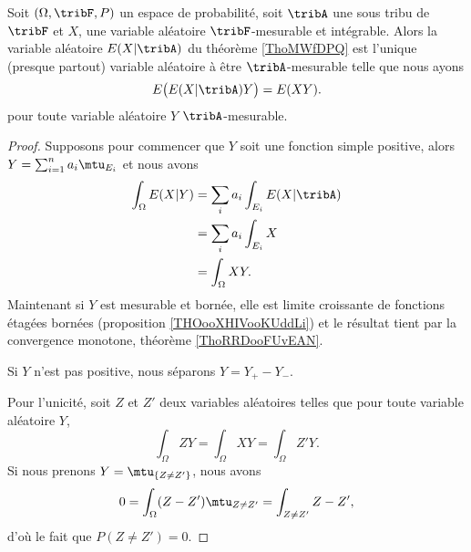 \begin{proposition}
    Soit \( (\Omega,\tribF,P)\) un espace de probabilité, soit \( \tribA\) une sous tribu de \( \tribF\) et \( X\), une variable aléatoire \( \tribF\)-mesurable et intégrable. Alors la variable aléatoire \( E(X|\tribA)\) du théorème \ref{ThoMWfDPQ} est l'unique (presque partout) variable aléatoire à être \( \tribA\)-mesurable telle que nous ayons
    \begin{equation}
        E\big( E(X|\tribA)Y \big)=E(XY).
    \end{equation}  
    pour toute variable aléatoire \( Y\) \( \tribA\)-mesurable.
\end{proposition}

\begin{proof}
    Supposons pour commencer que \( Y\) soit une fonction simple positive, alors \( Y=\sum_{i=1}^na_i\mtu_{E_i}\) et nous avons
    \begin{subequations}
        \begin{align}
            \int_{\Omega}E(X|Y)&=\sum_{i}a_i\int_{E_i}E(X|\tribA)\\
            &=\sum_ia_i\int_{E_i}X\\
            &=\int_{\Omega}XY.
        \end{align}
    \end{subequations}
    Maintenant si \( Y\) est mesurable et bornée, elle est limite croissante de fonctions étagées bornées (proposition \ref{THOooXHIVooKUddLi}) et le résultat tient par la convergence monotone, théorème \ref{ThoRRDooFUvEAN}.

    Si \( Y\) n'est pas positive, nous séparons \( Y=Y_+-Y_-\).

    Pour l'unicité, soit \( Z\) et \( Z'\) deux variables aléatoires telles que pour toute variable aléatoire \( Y\),
    \begin{equation}
        \int_{\Omega}ZY=\int_{\Omega}XY=\int_{\Omega}Z'Y.
    \end{equation}
    Si nous prenons \( Y=\mtu_{\{ Z\neq Z' \}}\), nous avons
    \begin{equation}
        0=\int_{\Omega}(Z-Z')\mtu_{Z\neq Z'}=\int_{Z\neq Z'}Z-Z',
    \end{equation}
    d'où le fait que \( P(Z\neq Z')=0\).
\end{proof}

